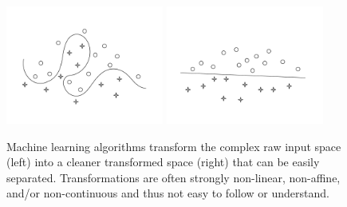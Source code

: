 \begin{figure}
\centering
\includegraphics[height=10.5em]{figs/motivation/ml_orig}
\raisebox{4.75em}{$\Rightarrow$}
\includegraphics[height=10.5em]{figs/motivation/ml_proj}
\caption{
Machine learning algorithms transform the complex raw input space (left)
into a cleaner transformed space (right) that can be easily separated.
Transformations are often strongly non-linear, non-affine, and/or non-continuous
and thus not easy to follow or understand.
}
\label{figs:motivation_ml}
\end{figure}